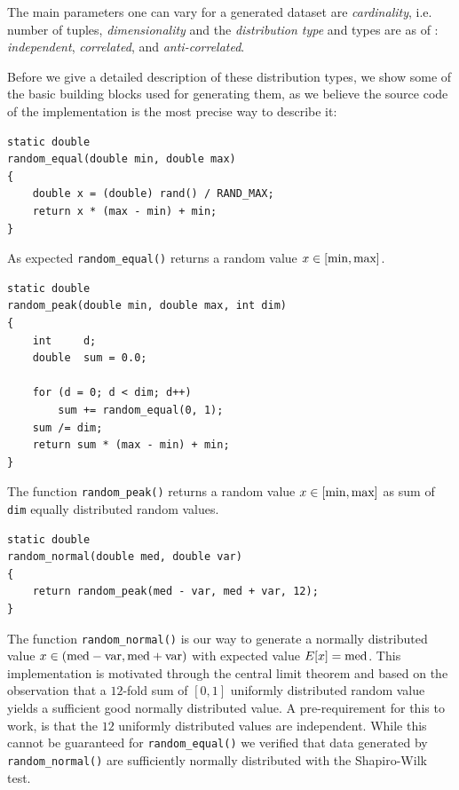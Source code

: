 The main parameters one can vary for a generated dataset are
\emph{cardinality}, i.e. number of tuples, \emph{dimensionality} and
the \emph{distribution type} and types are as of \citep{Borzsonyi2001}: 
\emph{independent}, \emph{correlated}, and \emph{anti-correlated}.


Before we give a detailed description of these distribution types, we
show some of the basic building blocks used for generating them, as we
believe the source code of the implementation is the most precise way to
describe it:

\medskip
\begin{lstlisting}
static double
random_equal(double min, double max)
{
	double x = (double) rand() / RAND_MAX;
	return x * (max - min) + min;
}
\end{lstlisting}
\medskip
%
\noindent
As expected \lstinline{random_equal()} returns a random value $x
\in [\textnormal{min}, \textnormal{max}]$.
%
\medskip
\begin{lstlisting}
static double
random_peak(double min, double max, int dim)
{
	int		d;
	double	sum = 0.0;

	for (d = 0; d < dim; d++)
		sum += random_equal(0, 1);
	sum /= dim;
	return sum * (max - min) + min;
}
\end{lstlisting}
\medskip

\noindent
The function \lstinline{random_peak()} returns a random value $x \in
[\textnormal{min}, \textnormal{max}]$ as sum of \lstinline{dim}
equally distributed random values.

\medskip
\begin{lstlisting}
static double
random_normal(double med, double var)
{
	return random_peak(med - var, med + var, 12);
}
\end{lstlisting}
\medskip

The function \lstinline{random_normal()} is our way to generate a
normally distributed value $x \in (\textnormal{med} -
\textnormal{var}, \textnormal{med} + \textnormal{var})$ with expected
value $E[x] = \textnormal{med}$.
%
This implementation is motivated through the central limit theorem and
based on the observation that a $12$-fold sum of $[0,1]$ uniformly
distributed random value yields a sufficient good normally distributed
value. A pre-requirement for this to work, is that the $12$ uniformly
distributed values are independent. While this cannot be guaranteed
for \lstinline{random_equal()} we verified that data generated by
\lstinline{random_normal()} are sufficiently normally distributed with
the Shapiro-Wilk test.

